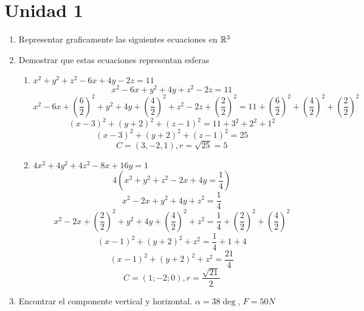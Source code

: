 \documentclass[../practica.root.tex]{subfiles}
\begin{document}
\section{Unidad 1}
\begin{enumerate}
    \item Representar graficamente las siguientes ecuaciones en $\mathbb{R}^3$

    \item Demostrar que estas ecuaciones representan esferas

          \begin{enumerate}
              \item $x^2 + y^2 + z^2 - 6x + 4y - 2z = 11$
                    \[ x^2 - 6x + y^2 + 4y + z^2 - 2z = 11 \]
                    \[
                        x^2 - 6x + \left(\frac{6}{2}\right)^2
                        + y^2 + 4y + \left(\frac{4}{2}\right)^2
                        + z^2 - 2z + \left(\frac{2}{2}\right)^2
                        = 11
                        + \left(\frac{6}{2}\right)^2
                        + \left(\frac{4}{2}\right)^2
                        + \left(\frac{2}{2}\right)^2
                    \] \[
                        (x - 3)^2 + (y + 2)^2 + (z - 1)^2 = 11 + 3^2 + 2^2 + 1^2
                    \] \[
                        (x - 3)^2 + (y + 2)^2 + (z - 1)^2 = 25
                    \] \[
                        \boxed{C = (3,-2,1), r = \sqrt{25} = 5}
                    \]

              \item $4x^2 + 4y^2 + 4z^2 - 8x + 16y = 1$
                    \[ 4\left(x^2 + y^2 + z^2 - 2x + 4y = \frac{1}{4}\right) \]
                    \[ x^2 - 2x + y^2 + 4y + z^2 = \frac{1}{4} \]
                    \[
                        x^2 - 2x + \left(\frac{2}{2}\right)^2
                        + y^2 + 4y + \left(\frac{4}{2}\right)^2
                        + z^2
                        = \frac{1}{4}
                        + \left(\frac{2}{2}\right)^2
                        + \left(\frac{4}{2}\right)^2
                    \] \[
                        (x - 1)^2 + (y + 2)^2 + z^2 = \frac{1}{4} + 1 + 4
                    \] \[
                        (x - 1)^2 + (y + 2)^2 + z^2 = \frac{21}{4}
                    \] \[
                        \boxed{C = (1; -2; 0), r = \frac{\sqrt{21}}{2}}
                    \]
          \end{enumerate}

    \item Encontrar el componente vertical y horizontal. $\alpha = 38\deg$, $F = 50N$


\end{enumerate}
\end{document}

